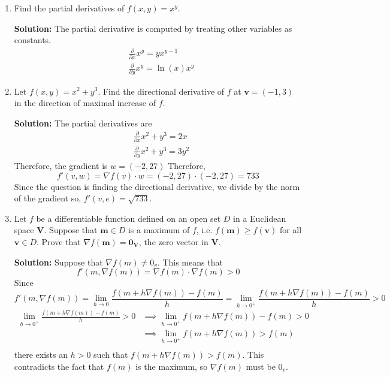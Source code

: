 \documentclass{report}
\newcommand{\solution}{\textbf{Solution: }}
\newcommand{\pdiv}[1]{\frac{\partial}{\partial #1}}
\begin{document}
\begin{enumerate}
	\medskip
	\item
	Find the partial derivatives of $f(x,y) = x^y$.

	\solution 
	The partial derivative is computed by treating other variables as constants.
	\begin{align*}
		&\pdiv{x} x^y = yx^{y-1} \\
		&\pdiv{y} x^y = \ln(x) x^y
	\end{align*}
	
	\medskip
	\item
	Let $f(x,y) = x^2+y^3$. Find the directional derivative of 
	$f$ at $\mathbf{v}=(-1,3)$ in the direction of maximal increase
	of $f$.

	\solution 
	The partial derivatives are 
	\begin{align*}
		&\pdiv{x} x^2+y^3 = 2x \\
		&\pdiv{y} x^2+y^3 = 3y^2
	\end{align*}
	Therefore, the gradient is $w=(-2, 27)$
	Therefore, 
	\[
		f'(v,w) = \nabla f(v) \cdot w = (-2, 27) \cdot (-2,27) = 733
	\]
	Since the question is finding the directional derivative,
	we divide by the norm of the gradient so,
	$f'(v, e) =  \sqrt{733}$.

	\medskip
	\item
	Let $f$ be a differentiable function defined on an open set $D$ 
	in a Euclidean space $\mathbf{V}$. Suppose that $\mathbf{m} \in D$
	is a maximum of $f$, i.e. $f(\mathbf{m}) \geq f(\mathbf{v})$ for all
	$\mathbf{v} \in D$. Prove that $\nabla f(\mathbf{m}) = \mathbf{0}_\mathbf{V}$,
	the zero vector in $\mathbf{V}.$

	\solution
	Suppose that $\nabla f(m) \neq 0_v$.
	This means that 
	\[
		f'(m, \nabla f(m)) =
		\nabla f(m) \cdot \nabla f(m) 
		> 0
	\]
	Since
	\[
		f'(m, \nabla f(m)) = 
		\lim_{h \to 0} \frac{f(m+h\nabla f(m))-f(m)}{h} =
		\lim_{h \to 0^+} \frac{f(m+h\nabla f(m))-f(m)}{h} 
		> 0
	\]
	\begin{align*}
		\lim_{h \to 0^+} \frac{f(m+h\nabla f(m))-f(m)}{h} > 0
		&\implies \lim_{h \to 0^+} f(m+h\nabla f(m))-f(m) > 0 \\ 
		&\implies \lim_{h \to 0^+} f(m+h\nabla f(m)) > f(m) \\ 
	\end{align*}
	there exists an $h > 0$ such that $f(m+h\nabla f(m)) > f(m)$.	
	This contradicts the fact that $f(m)$ is the maximum, so 
	$\nabla f(m)$ must be $0_v$.
	
	\end{enumerate}
	
\end{document}
